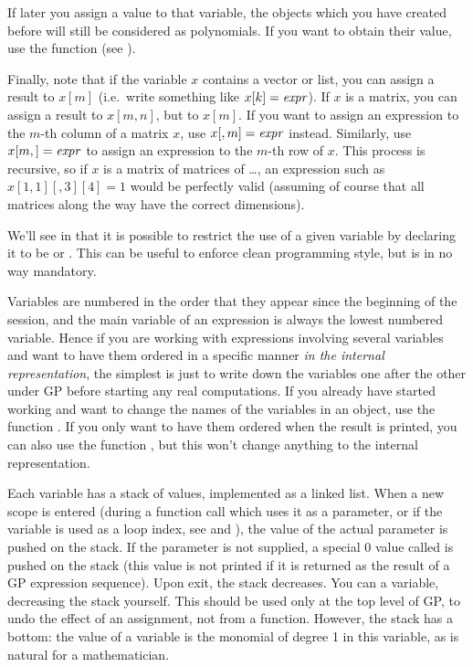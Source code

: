   If later you assign a value to that variable, the objects which you have
created before will still be considered as polynomials. If you want to obtain
their value, use the function  (see ).

  Finally, note that if the variable $x$ contains a vector or list, you can
assign a result to $x[m]$ (i.e.~write something like $x[k]=\hbox{\it expr\/}$). If
$x$ is a matrix, you can assign a result to $x[m,n]$, but  to
$x[m]$. If you want to assign an expression to the $m$-th column of a matrix
$x$, use $x[,m]=\hbox{\it expr\/}$ instead. Similarly, use $x[m,]=\hbox{\it expr\/}$ to
assign an expression to the $m$-th row of $x$. This process is recursive, so
if $x$ is a matrix of matrices of \dots, an expression such as
$x[1,1][,3][4]=1$ would be perfectly valid (assuming of course that all
matrices along the way have the correct dimensions).

 We'll see in  that it is possible
to restrict the use of a given variable by declaring it to be  or
. This can be useful to enforce clean programming style, but is in
no way mandatory.

 Variables are numbered in the order that they
appear since the beginning of the session, and the main variable of an
expression is always the lowest numbered variable. Hence if you are working
with expressions involving several variables and want to have them ordered in
a specific manner {\it in the internal representation}, the simplest is just
to write down the variables one after the other under GP before starting any
real computations. If you already have started working and want to change the
names of the variables in an object, use the function . If you
only want to have them ordered when the result is printed, you can also use
the function , but this won't change anything to the internal
representation.

Each variable has a stack of values, implemented as a linked list. When a new
scope is entered (during a function call which uses it as a parameter, or if
the variable is used as a loop index, see  and
), the value of the actual parameter is pushed on the
stack. If the parameter is not supplied, a special $0$ value called
 is pushed on the stack (this value is not printed if it is
returned as the result of a GP expression sequence). Upon exit, the stack
decreases. You can  a variable, decreasing the stack yourself. This
should be used only at the top level of GP, to undo the effect of an
assignment, not from a function. However, the stack has a bottom: the value
of a variable is the monomial of degree 1 in this variable, as is natural for
a mathematician.

